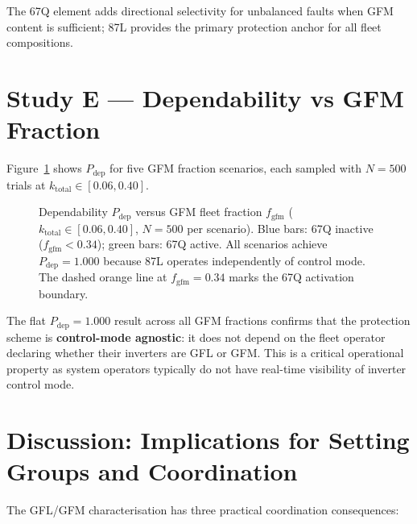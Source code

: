 \documentclass[11pt,a4paper]{article}
\begin{document}
\medskip\noindent
The 67Q element adds directional selectivity for unbalanced faults when
GFM content is sufficient; 87L provides the primary protection anchor for
all fleet compositions.

\section{Study E --- Dependability vs GFM Fraction}
\label{sec:studyE}

Figure~\ref{fig:coverage} shows $P_\mathrm{dep}$ for five GFM fraction
scenarios, each sampled with $N=500$ trials at $k_\mathrm{total}\in[0.06,0.40]$.

\begin{figure}[htbp]
  \centering
  \resizebox{0.84\textwidth}{!}{}
  \caption{Dependability $P_\mathrm{dep}$ versus GFM fleet fraction
           $f_\mathrm{gfm}$ ($k_\mathrm{total}\in[0.06,0.40]$, $N=500$
           per scenario).  Blue bars: 67Q inactive ($f_\mathrm{gfm}<0.34$);
           green bars: 67Q active.  All scenarios achieve $P_\mathrm{dep}=1.000$
           because 87L operates independently of control mode.  The dashed
           orange line at $f_\mathrm{gfm}=0.34$ marks the 67Q activation
           boundary.}
  \label{fig:coverage}
\end{figure}

\noindent
The flat $P_\mathrm{dep}=1.000$ result across all GFM fractions confirms that
the protection scheme is \textbf{control-mode agnostic}: it does not depend on
the fleet operator declaring whether their inverters are GFL or GFM.  This is
a critical operational property as system operators typically do not have
real-time visibility of inverter control mode.

\section{Discussion: Implications for Setting Groups and Coordination}
\label{sec:discussion}

The GFL/GFM characterisation has three practical coordination consequences:
\end{document}
